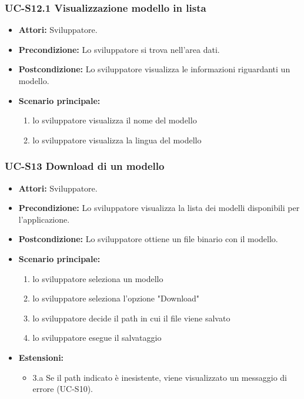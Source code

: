 \subsubsection{UC-S12.1 Visualizzazione modello in lista}
		\begin{itemize}
			\item \textbf{Attori:} Sviluppatore.
			\item \textbf{Precondizione:} Lo sviluppatore si trova nell'area dati.
			\item \textbf{Postcondizione:} Lo sviluppatore visualizza le informazioni riguardanti un modello.
			\item \textbf{Scenario principale:}
			\begin{enumerate}
					\item lo sviluppatore visualizza il nome del modello
					\item lo sviluppatore visualizza la lingua del modello
				\end{enumerate}
		\end{itemize}			
	
	\subsubsection{UC-S13 Download di un modello}
		\begin{itemize}
			\item \textbf{Attori:} Sviluppatore.
			\item \textbf{Precondizione:} Lo sviluppatore visualizza la lista dei modelli disponibili per l'applicazione.
			\item \textbf{Postcondizione:} Lo sviluppatore ottiene un file binario con il modello.
			\item \textbf{Scenario principale:}
			\begin{enumerate}
				\item lo sviluppatore seleziona un modello
				\item lo sviluppatore seleziona l'opzione "Download"
				\item lo sviluppatore decide il path in cui il file viene salvato
				\item lo sviluppatore esegue il salvataggio
			\end{enumerate}
			\item \textbf{Estensioni:}
				\begin{itemize}
					\item 3.a Se il path indicato è inesistente, viene visualizzato un messaggio di errore (UC-S10).
				\end{itemize}
		\end{itemize}	

